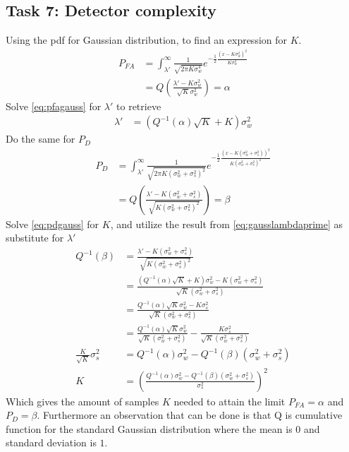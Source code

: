 \subsection{Task 7: Detector complexity}
Using the pdf for Gaussian distribution, to find an expression for $K$.
\begin{align}
    P_{FA} & = 
    \int_{\lambda'}^{\infty}\frac{1}{\sqrt{2\pi K\sigma_w^4}}e^{-\frac{1}{2}\frac{\left(x-K\sigma_w^2\right)^2}{K\sigma_w^4}}\nonumber\\
    & = Q\left(\frac{\lambda'-K\sigma_w^2}{\sqrt{K}\sigma_w^2}\right)
    = \alpha\label{eq:pfagauss}
\end{align}
Solve \eqref{eq:pfagauss} for $\lambda'$ to retrieve
\begin{align}
    \lambda' & = \left(Q^{-1}(\alpha)\sqrt{K}+K\right)\sigma_w^2\label{eq:gausslambdaprime}
    \end{align}
Do the same for $P_D$
\begin{align}
    P_{D} & = 
    \int_{\lambda'}^{\infty}\frac{1}{\sqrt{2\pi K(\sigma_w^2+\sigma_s^2)^2}}e^{-\frac{1}{2}\frac{(x-K(\sigma_w^2+\sigma_s^2))^2}{K(\sigma_w^2+\sigma_s^2)^2}}\nonumber\\
    & = Q\left(\frac{\lambda'-K(\sigma_w^2+\sigma_s^2)}{\sqrt{K(\sigma_w^2+\sigma_s^2)^2}}\right)
    = \beta\label{eq:pdgauss}
\end{align}
Solve \eqref{eq:pdgauss} for $K$, and utilize the result from \eqref{eq:gausslambdaprime} as substitute for $\lambda'$
\begin{align}
    Q^{-1}(\beta) & = \frac{\lambda'-K(\sigma_w^2+\sigma_s^2)}{\sqrt{K(\sigma_w^2+\sigma_s^2)^2}}\nonumber\\
    & = \frac{(Q^{-1}(\alpha)\sqrt{K}+K)\sigma_w^2-K(\sigma_w^2+\sigma_s^2)}{\sqrt{K}(\sigma_w^2+\sigma_s^2)}\nonumber\\
    & = \frac{Q^{-1}(\alpha)\sqrt{K}\sigma_w^2-K\sigma_s^2}{\sqrt{K}(\sigma_w^2+\sigma_s^2)}\nonumber\\
    & = \frac{Q^{-1}(\alpha)\sqrt{K}\sigma_w^2}{\sqrt{K}(\sigma_w^2+\sigma_s^2)}-\frac{K\sigma_s^2}{\sqrt{K}(\sigma_w^2+\sigma_s^2)}\nonumber\\
    \frac{K}{\sqrt{K}}\sigma_s^2 & = Q^{-1}(\alpha)\sigma_w^2-Q^{-1}(\beta)(\sigma_w^2+\sigma_s^2)\nonumber\\
    K & = \left( \frac{Q^{-1}(\alpha)\sigma_w^2-Q^{-1}(\beta)(\sigma_w^2+\sigma_s^2)}{\sigma_s^2}\right)^2
\end{align}
Which gives the amount of samples $K$ needed to attain the limit $P_{FA} = \alpha$ and $P_D = \beta$. Furthermore an observation that can be done is that Q is cumulative function for the standard Gaussian distribution where the mean is $0$ and standard deviation is $1$.







